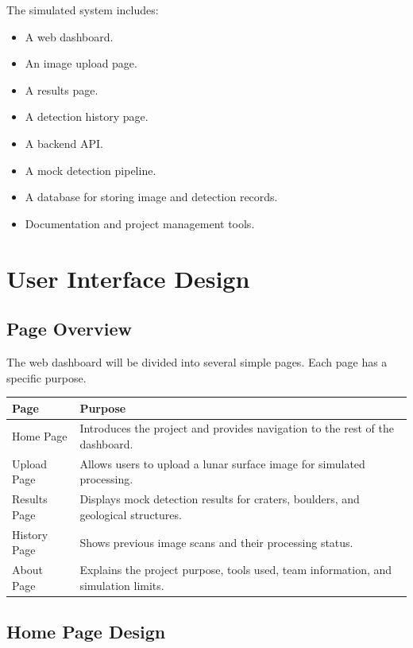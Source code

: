 \documentclass[12pt]{article}
\begin{document}
The simulated system includes:

\begin{itemize}
    \item A web dashboard.
    \item An image upload page.
    \item A results page.
    \item A detection history page.
    \item A backend API.
    \item A mock detection pipeline.
    \item A database for storing image and detection records.
    \item Documentation and project management tools.
\end{itemize}

\section{User Interface Design}

\subsection{Page Overview}

The web dashboard will be divided into several simple pages. Each page has a specific purpose.

\begin{longtable}{|p{1.7in}|p{4.3in}|}
\hline
\textbf{Page} & \textbf{Purpose} \\
\hline
Home Page & Introduces the project and provides navigation to the rest of the dashboard. \\
\hline
Upload Page & Allows users to upload a lunar surface image for simulated processing. \\
\hline
Results Page & Displays mock detection results for craters, boulders, and geological structures. \\
\hline
History Page & Shows previous image scans and their processing status. \\
\hline
About Page & Explains the project purpose, tools used, team information, and simulation limits. \\
\hline
\end{longtable}

\subsection{Home Page Design}
\end{document}
